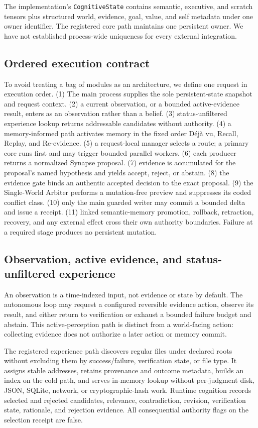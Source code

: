\documentclass[10pt]{article}
\newcommand{\code}[1]{\texttt{#1}}
\begin{document}
The implementation's \code{CognitiveState} contains semantic, executive, and scratch tensors plus structured world, evidence, goal, value, and self metadata under one owner identifier. The registered core path maintains one persistent owner. We have not established process-wide uniqueness for every external integration.

\subsection{Ordered execution contract}

To avoid treating a bag of modules as an architecture, we define one request in execution order. (1) The main process supplies the sole persistent-state snapshot and request context. (2) a current observation, or a bounded active-evidence result, enters as an observation rather than a belief. (3) status-unfiltered experience lookup returns addressable candidates without authority. (4) a memory-informed path activates memory in the fixed order D\'ej\`a vu, Recall, Replay, and Re-evidence. (5) a request-local manager selects a route; a primary core runs first and may trigger bounded parallel workers. (6) each producer returns a normalized Synapse proposal. (7) evidence is accumulated for the proposal's named hypothesis and yields accept, reject, or abstain. (8) the evidence gate binds an authentic accepted decision to the exact proposal. (9) the Single-World Arbiter performs a mutation-free preview and suppresses its coded conflict class. (10) only the main guarded writer may commit a bounded delta and issue a receipt. (11) linked semantic-memory promotion, rollback, retraction, recovery, and any external effect cross their own authority boundaries. Failure at a required stage produces no persistent mutation.

\subsection{Observation, active evidence, and status-unfiltered experience}

An observation is a time-indexed input, not evidence or state by default. The autonomous loop may request a configured reversible evidence action, observe its result, and either return to verification or exhaust a bounded failure budget and abstain. This active-perception path is distinct from a world-facing action: collecting evidence does not authorize a later action or memory commit.

The registered experience path discovers regular files under declared roots without excluding them by success/failure, verification state, or file type. It assigns stable addresses, retains provenance and outcome metadata, builds an index on the cold path, and serves in-memory lookup without per-judgment disk, JSON, SQLite, network, or cryptographic-hash work. Runtime cognition records selected and rejected candidates, relevance, contradiction, revision, verification state, rationale, and rejection evidence. All consequential authority flags on the selection receipt are false.
\end{document}
